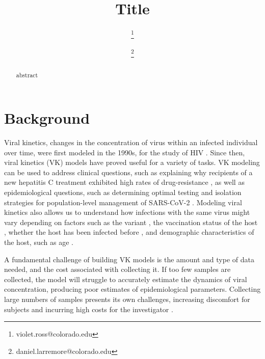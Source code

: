 \documentclass[11pt,notitlepage]{article}
\begin{document}
\author[1]{\thanks{violet.ross@colorado.edu}}
\author[1,2,3]{\thanks{daniel.larremore@colorado.edu}}
\date{}
\title{Title}
\maketitle
\begin{abstract}
abstract
\end{abstract}



\section{Background}
\label{sec-intro}

Viral kinetics, changes in the concentration of virus within an infected individual over time, were first modeled in the 1990s, for the study of HIV \cite{perelson1996hiv}.
Since then, viral kinetics (VK) models have proved useful for a variety of tasks.
VK modeling can be used to address clinical questions, such as explaining why recipients of a new hepatitis C treatment exhibited high rates of drug-resistance \cite{rong2012modeling}, as well as epidemiological questions, such as determining optimal testing and isolation strategies for population-level management of SARS-CoV-2 \cite{kissler2021viral}.  
Modeling viral kinetics also allows us to understand how infections with the same virus might vary depending on factors such as the variant \cite{russell2024combined}, the vaccination status of the host \cite{ke2022longitudinal}, whether the host has been infected before \cite{kissler2023viral}, and demographic characteristics of the host, such as age \cite{russell2024combined}.

A fundamental challenge of building VK models is the amount and type of data needed, and the cost associated with collecting it.
If too few samples are collected, the model will struggle to accurately estimate the dynamics of viral concentration, producing poor estimates of epidemiological parameters.
Collecting large numbers of samples presents its own challenges, increasing discomfort for subjects and incurring high costs for the investigator \cite{canini2011viral}.   
\end{document}
